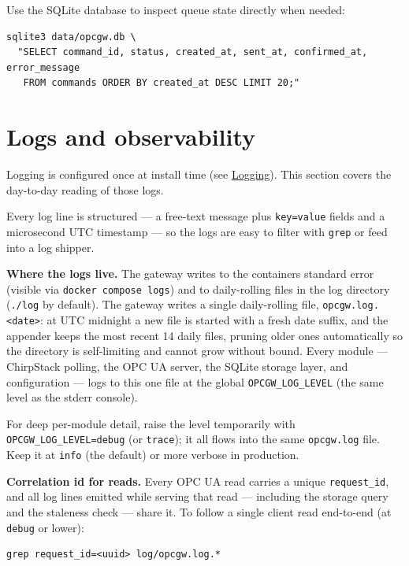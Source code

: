 Use the SQLite database to inspect queue state directly when needed:

\begin{lstlisting}
sqlite3 data/opcgw.db \
  "SELECT command_id, status, created_at, sent_at, confirmed_at, error_message
   FROM commands ORDER BY created_at DESC LIMIT 20;"
\end{lstlisting}

\section{Logs and observability}\label{sec-logs-observability}

Logging is configured once at install time (see \hyperref[sec-install-logging]{Logging}). This section covers the day-to-day reading of those logs.

Every log line is structured --- a free-text message plus \texttt{key=value} fields and a microsecond UTC timestamp --- so the logs are easy to filter with \texttt{grep} or feed into a log shipper.

\textbf{Where the logs live.} The gateway writes to the container\textquotesingle s standard error (visible via \texttt{docker\ compose\ logs}) and to daily-rolling files in the log directory (\texttt{./log} by default). The gateway writes a single daily-rolling file, \texttt{opcgw.log.\textless{}date\textgreater{}}: at UTC midnight a new file is started with a fresh date suffix, and the appender keeps the most recent 14 daily files, pruning older ones automatically so the directory is self-limiting and cannot grow without bound. Every module --- ChirpStack polling, the OPC UA server, the SQLite storage layer, and configuration --- logs to this one file at the global \texttt{OPCGW\_LOG\_LEVEL} (the same level as the stderr console).

For deep per-module detail, raise the level temporarily with \texttt{OPCGW\_LOG\_LEVEL=debug} (or \texttt{trace}); it all flows into the same \texttt{opcgw.log} file. Keep it at \texttt{info} (the default) or more verbose in production.

\textbf{Correlation id for reads.} Every OPC UA read carries a unique \texttt{request\_id}, and all log lines emitted while serving that read --- including the storage query and the staleness check --- share it. To follow a single client read end-to-end (at \texttt{debug} or lower):

\begin{lstlisting}
grep request_id=<uuid> log/opcgw.log.*
\end{lstlisting}

